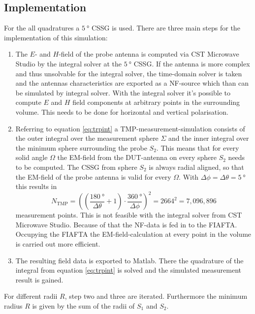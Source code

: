 \subsection{Implementation}

For the all quadratures a $\SI{5}{\degree}$ \ac{CSSG} is used. There are three main steps for the implementation of this simulation:

\begin{enumerate}
\item The $E$- and $H$-field of the probe antenna is computed via CST Microwave Studio\texttrademark{} by the integral solver at the $\SI{5}{\degree}$ \ac{CSSG}. If the antenna is more complex and thus unsolvable for the integral solver, the time-domain solver is taken and the antennas characteristics are exported as a \ac{NF}-source which than can be simulated by integral solver. With the integral solver it's possible to compute $E$ and $H$ field components at arbitrary points in the surrounding volume. This needs to be done for horizontal and vertical polarisation.
\item Referring to equation \ref{eq:trpint} a \ac{TMP}-measurement-simulation consists of the outer integral over the measurement sphere $\Sigma$ and the inner integral over the minimum sphere surrounding the probe $S_2$. This means that for every solid angle $\Omega$ the \ac{EM}-field from the \ac{DUT}-antenna on every sphere $S_2$ needs to be computed. The \ac{CSSG} from sphere $S_2$ is always radial aligned, so that the \ac{EM}-field of the probe antenna is valid for every $\Omega$. With $\Delta\phi=\Delta\theta=\SI{5}{\degree}$ this results in
\begin{equation}
N_\text{TMP}=\left(\left(\frac{\SI{180}{\degree}}{\Delta\theta}+1\right)\cdot\frac{\SI{360}{\degree}}{\Delta\phi}\right)^2=2664^2=7,096,896
\end{equation}
measurement points. This is not feasible with the integral solver from CST Microwave Studio\texttrademark{}. Because of that the \ac{NF}-data is fed in to the \ac{FIAFTA}. Occupying the \ac{FIAFTA} the \ac{EM}-field-calculation at every point in the volume is carried out more efficient.\cite{mypaper} \cite{fiafta}
\item The resulting field data is exported to Matlab\texttrademark{}. There the quadrature of the integral from equation \ref{eq:trpint} is solved and the simulated measurement result is gained.
\end{enumerate} 

For different radii $R$, step two and three are iterated. Furthermore the minimum radius $R$ is given by the sum of the radii of $S_1$ and $S_2$.

